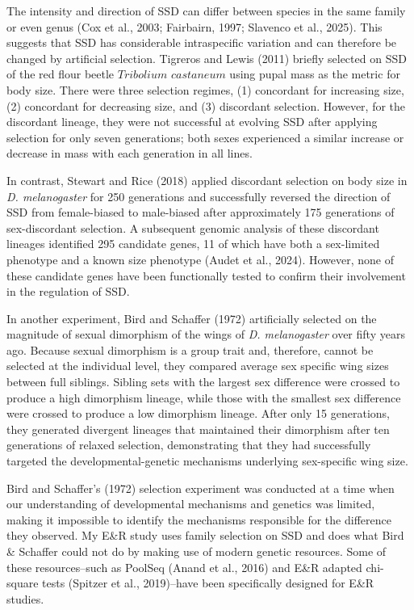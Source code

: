 \documentclass[12pt,reqno,oneside]{report}
\begin{document}
The intensity and direction of SSD can differ between species in the same family or even genus (Cox et al., 2003; Fairbairn, 1997; Slavenco et al., 2025). This suggests that SSD has considerable intraspecific variation and can therefore be changed by artificial selection. Tigreros and Lewis (2011) briefly selected on SSD of the red flour beetle \(Tribolium\) \(castaneum\) using pupal mass as the metric for body size. There were three selection regimes, (1) concordant for increasing size, (2) concordant for decreasing size, and (3) discordant selection. However, for the discordant lineage, they were not successful at evolving SSD after applying selection for only seven generations; both sexes experienced a similar increase or decrease in mass with each generation in all lines.

In contrast, Stewart and Rice (2018) applied discordant selection on body size in \textit{D. melanogaster} for 250 generations and successfully reversed the direction of SSD from female-biased to male-biased after approximately 175 generations of sex-discordant selection. A subsequent genomic analysis of these discordant lineages identified 295 candidate genes, 11 of which have both a sex-limited phenotype and a known size phenotype (Audet et al., 2024). However, none of these candidate genes have been functionally tested to confirm their involvement in the regulation of SSD.

In another experiment, Bird and Schaffer (1972) artificially selected on the magnitude of sexual dimorphism of the wings of \textit{D. melanogaster} over fifty years ago. Because sexual dimorphism is a group trait and, therefore, cannot be selected at the individual level, they compared average sex specific wing sizes between full siblings. Sibling sets with the largest sex difference were crossed to produce a high dimorphism lineage, while those with the smallest sex difference were crossed to produce a low dimorphism lineage. After only 15 generations, they generated divergent lineages that maintained their dimorphism after ten generations of relaxed selection, demonstrating that they had successfully targeted the developmental-genetic mechanisms underlying sex-specific wing size. 

Bird and Schaffer's (1972) selection experiment was conducted at a time when our understanding of developmental mechanisms and genetics was limited, making it impossible to identify the mechanisms responsible for the difference they observed. My E\&R study uses family selection on SSD and does what Bird \& Schaffer could not do by making use of modern genetic resources. Some of these resources--such as PoolSeq (Anand et al., 2016) and E\&R adapted chi-square tests (Spitzer et al., 2019)--have been specifically designed for E\&R studies.
\end{document}
